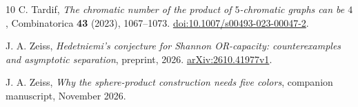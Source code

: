 \documentclass[11pt]{amsart}
\theoremstyle{definition}
\theoremstyle{remark}
\numberwithin{equation}{section}
\begin{document}
\begin{thebibliography}{10}
C. Tardif,
\emph{The chromatic number of the product of $5$-chromatic graphs can be $4$},
Combinatorica \textbf{43} (2023), 1067--1073.
\href{https://doi.org/10.1007/s00493-023-00047-2}{doi:10.1007/s00493-023-00047-2}.

J. A. Zeiss,
\emph{Hedetniemi's conjecture for Shannon OR-capacity: counterexamples and asymptotic separation},
preprint, 2026.
\href{https://arxiv.org/abs/2610.41977v1}{arXiv:2610.41977v1}.

J. A. Zeiss,
\emph{Why the sphere-product construction needs five colors},
companion manuscript, November 2026.

\end{thebibliography}
\end{document}
